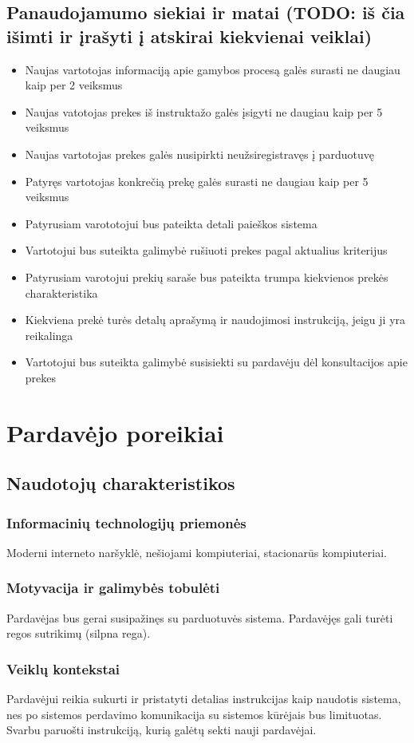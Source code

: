 \documentclass[oneside]{VUMIFPSkursinis}
\begin{document}
	\subsection{Panaudojamumo siekiai ir matai (TODO: iš čia išimti ir įrašyti į atskirai kiekvienai veiklai)}
		\begin{itemize}
			\item{Naujas vartotojas informaciją apie gamybos procesą galės surasti ne daugiau kaip per 2 veiksmus}
			\item{Naujas vatotojas prekes iš instruktažo galės įsigyti ne daugiau kaip per 5 veiksmus}
			\item{Naujas vartotojas prekes galės nusipirkti neužsiregistravęs į parduotuvę}
			\item{Patyręs vartotojas konkrečią prekę galės surasti ne daugiau kaip per 5 veiksmus}
			\item{Patyrusiam varototojui bus pateikta detali paieškos sistema}
			\item{Vartotojui bus suteikta galimybė rušiuoti prekes pagal aktualius kriterijus}
			\item{Patyrusiam varotojui prekių saraše bus pateikta trumpa kiekvienos prekės charakteristika}
			\item{Kiekviena prekė turės detalų aprašymą ir naudojimosi instrukciją, jeigu ji yra reikalinga}
			\item{Vartotojui bus suteikta galimybė susisiekti su pardavėju dėl konsultacijos apie prekes}
		\end{itemize}
\section{Pardavėjo poreikiai}
	\subsection{Naudotojų charakteristikos}
		\subsubsection{Informacinių technologijų priemonės}
			Moderni interneto naršyklė, nešiojami kompiuteriai, stacionarūs kompiuteriai.
		\subsubsection{Motyvacija ir galimybės tobulėti}
			Pardavėjas bus gerai susipažinęs su parduotuvės sistema. Pardavėjęs gali turėti regos sutrikimų (silpna rega).
		\subsubsection{Veiklų kontekstai}
			Pardavėjui reikia sukurti ir pristatyti detalias instrukcijas kaip naudotis sistema, nes po sistemos perdavimo komunikacija su sistemos kūrėjais bus limituotas. Svarbu paruošti instrukciją, kurią galėtų sekti nauji pardavėjai.
\end{document}
